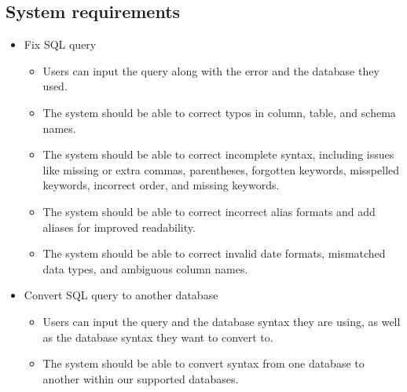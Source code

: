     \subsection{System requirements}
    \begin{itemize}
        \item  Fix SQL query
        \begin{itemize}
            \item Users can input the query along with the error and the database they used.
            \item The system should be able to correct typos in column, table, and schema names.
            \item The system should be able to correct incomplete syntax, including issues like missing or extra commas, parentheses, forgotten keywords, misspelled keywords, incorrect order, and missing keywords.
            \item The system should be able to correct incorrect alias formats and add aliases for improved readability.
            \item The system should be able to correct invalid date formats, mismatched data types, and ambiguous column names.
        \end{itemize}

        \item  Convert SQL query to another database
        \begin{itemize}
            \item Users can input the query and the database syntax they are using, as well as the database syntax they want to convert to.
            \item The system should be able to convert syntax from one database to another within our supported databases.
        \end{itemize}


\end{itemize}
